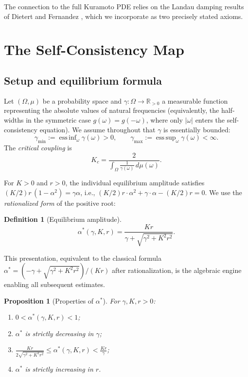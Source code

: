 \documentclass[12pt]{article}
\newtheorem{proposition}[theorem]{Proposition}
\theoremstyle{definition}
\newtheorem{definition}[theorem]{Definition}
\begin{document}
The connection to the full Kuramoto PDE relies on
the Landau damping results of Dietert and Fernandez \cite{dietert2018},
which we incorporate as two precisely stated axioms.


\section{The Self-Consistency Map}

\subsection{Setup and equilibrium formula}

Let $(\Omega, \mu)$ be a probability space and $\gamma : \Omega \to \mathbb{R}_{>0}$
a measurable function representing the absolute values of natural frequencies
(equivalently, the half-widths in the symmetric case $g(\omega) = g(-\omega)$,
where only $|\omega|$ enters the self-consistency equation).
We assume throughout that $\gamma$ is essentially bounded:
\[
\gamma_{\min} := \operatorname{ess\,inf}_\omega \gamma(\omega) > 0, \qquad
\gamma_{\max} := \operatorname{ess\,sup}_\omega \gamma(\omega) < \infty.
\]
The \emph{critical coupling} is
\begin{equation}\label{eq:Kc}
K_c = \frac{2}{\int_\Omega \frac{1}{\gamma(\omega)}\,d\mu(\omega)}.
\end{equation}

For $K > 0$ and $r > 0$, the individual equilibrium amplitude
satisfies $(K/2)r\,(1 - \alpha^2) = \gamma\alpha$, i.e.,
$(K/2)r\cdot\alpha^2 + \gamma\cdot\alpha - (K/2)r = 0$.
We use the \emph{rationalized form} of the positive root:

\begin{definition}[Equilibrium amplitude]\label{def:equil}
\[
\alpha^*(\gamma, K, r) = \frac{Kr}{\gamma + \sqrt{\gamma^2 + K^2 r^2}}.
\]
\end{definition}

This presentation, equivalent to the classical formula
$\alpha^* = (-\gamma + \sqrt{\gamma^2 + K^2r^2})/(Kr)$
after rationalization, is the algebraic engine enabling all subsequent estimates.

\begin{proposition}[Properties of $\alpha^*$]\label{prop:equil_props}
For $\gamma, K, r > 0$:
\begin{enumerate}[label=(\alph*)]
\item $0 < \alpha^*(\gamma,K,r) < 1$;
\item $\alpha^*$ is strictly decreasing in $\gamma$;
\item $\frac{Kr}{2\sqrt{\gamma^2+K^2r^2}} \le \alpha^*(\gamma,K,r) < \frac{Kr}{\gamma}$;
\item $\alpha^*$ is strictly increasing in $r$.
\end{enumerate}
\end{proposition}
\end{document}
